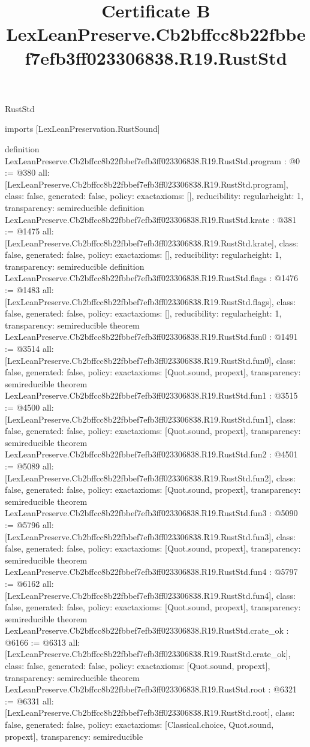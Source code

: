 \begin{lexlean}{RustStd}
\title{Certificate B LexLeanPreserve.Cb2bffcc8b22fbbef7efb3ff023306838.R19.RustStd}
\begin{coremodule}
imports [LexLeanPreservation.RustSound]

definition LexLeanPreserve.Cb2bffcc8b22fbbef7efb3ff023306838.R19.RustStd.program : @0 := @380 {
  all: [LexLeanPreserve.Cb2bffcc8b22fbbef7efb3ff023306838.R19.RustStd.program],
  class: false,
  generated: false,
  policy: exact{axioms: []},
  reducibility: regular{height: 1},
  transparency: semireducible
}
definition LexLeanPreserve.Cb2bffcc8b22fbbef7efb3ff023306838.R19.RustStd.krate : @381 := @1475 {
  all: [LexLeanPreserve.Cb2bffcc8b22fbbef7efb3ff023306838.R19.RustStd.krate],
  class: false,
  generated: false,
  policy: exact{axioms: []},
  reducibility: regular{height: 1},
  transparency: semireducible
}
definition LexLeanPreserve.Cb2bffcc8b22fbbef7efb3ff023306838.R19.RustStd.flags : @1476 := @1483 {
  all: [LexLeanPreserve.Cb2bffcc8b22fbbef7efb3ff023306838.R19.RustStd.flags],
  class: false,
  generated: false,
  policy: exact{axioms: []},
  reducibility: regular{height: 1},
  transparency: semireducible
}
theorem LexLeanPreserve.Cb2bffcc8b22fbbef7efb3ff023306838.R19.RustStd.fun0 : @1491 := @3514 {
  all: [LexLeanPreserve.Cb2bffcc8b22fbbef7efb3ff023306838.R19.RustStd.fun0],
  class: false,
  generated: false,
  policy: exact{axioms: [Quot.sound, propext]},
  transparency: semireducible
}
theorem LexLeanPreserve.Cb2bffcc8b22fbbef7efb3ff023306838.R19.RustStd.fun1 : @3515 := @4500 {
  all: [LexLeanPreserve.Cb2bffcc8b22fbbef7efb3ff023306838.R19.RustStd.fun1],
  class: false,
  generated: false,
  policy: exact{axioms: [Quot.sound, propext]},
  transparency: semireducible
}
theorem LexLeanPreserve.Cb2bffcc8b22fbbef7efb3ff023306838.R19.RustStd.fun2 : @4501 := @5089 {
  all: [LexLeanPreserve.Cb2bffcc8b22fbbef7efb3ff023306838.R19.RustStd.fun2],
  class: false,
  generated: false,
  policy: exact{axioms: [Quot.sound, propext]},
  transparency: semireducible
}
theorem LexLeanPreserve.Cb2bffcc8b22fbbef7efb3ff023306838.R19.RustStd.fun3 : @5090 := @5796 {
  all: [LexLeanPreserve.Cb2bffcc8b22fbbef7efb3ff023306838.R19.RustStd.fun3],
  class: false,
  generated: false,
  policy: exact{axioms: [Quot.sound, propext]},
  transparency: semireducible
}
theorem LexLeanPreserve.Cb2bffcc8b22fbbef7efb3ff023306838.R19.RustStd.fun4 : @5797 := @6162 {
  all: [LexLeanPreserve.Cb2bffcc8b22fbbef7efb3ff023306838.R19.RustStd.fun4],
  class: false,
  generated: false,
  policy: exact{axioms: [Quot.sound, propext]},
  transparency: semireducible
}
theorem LexLeanPreserve.Cb2bffcc8b22fbbef7efb3ff023306838.R19.RustStd.crate_ok : @6166 := @6313 {
  all: [LexLeanPreserve.Cb2bffcc8b22fbbef7efb3ff023306838.R19.RustStd.crate_ok],
  class: false,
  generated: false,
  policy: exact{axioms: [Quot.sound, propext]},
  transparency: semireducible
}
theorem LexLeanPreserve.Cb2bffcc8b22fbbef7efb3ff023306838.R19.RustStd.root : @6321 := @6331 {
  all: [LexLeanPreserve.Cb2bffcc8b22fbbef7efb3ff023306838.R19.RustStd.root],
  class: false,
  generated: false,
  policy: exact{axioms: [Classical.choice, Quot.sound, propext]},
  transparency: semireducible
}


\end{coremodule}
\end{lexlean}
